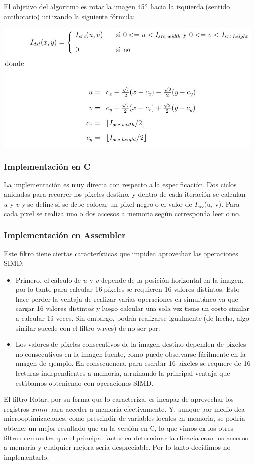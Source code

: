 El objetivo del algoritmo es rotar la imagen 45$\degree$ hacia la izquierda (sentido antihorario) utilizando la siguiente fórmula:

\includegraphics[width=\textwidth]{rotar.jpg} 

\subsubsection{Implementación en C}

La implementación es muy directa con respecto a la especificación. Dos ciclos anidados para recorrer los píxeles destino, y dentro de cada iteración se calculan $u$ y $v$ y se define si se debe colocar un pixel negro o el valor de $I_{src}$(u, v).
Para cada pixel se realiza uno o dos accesos a memoria según corresponda leer o no.

\subsubsection{Implementación en Assembler}

Este filtro tiene ciertas características que impiden aprovechar las operaciones SIMD:
\begin{itemize}
\item Primero, el cálculo de $u$ y $v$ depende de la posición horizontal en la imagen, por lo tanto para calcular 16 píxeles se requieren 16 valores distintos. Esto hace perder la ventaja de realizar varias operaciones en simultáneo ya que cargar 16 valores distintos y luego calcular una sola vez tiene un costo similar a calcular 16 veces. Sin embargo, podría realizarse igualmente (de hecho, algo similar sucede con el filtro waves) de no ser por:
\item Los valores de píxeles consecutivos de la imagen destino dependen de píxeles no consecutivos en la imagen fuente, como puede observarse fácilmente en la imagen de ejemplo. En consecuencia, para escribir 16 píxeles se requiere de 16 lecturas independientes a memoria, arruinando la principal ventaja que estábamos obteniendo con operaciones SIMD.
\end{itemize}

El filtro Rotar, por su forma que lo caracteriza, es incapaz de aprovechar los registros $xmm$ para acceder a memoria efectivamente. Y, aunque por medio dea microoptimizaciones, como prescindir de variables locales en memoria, se podría obtener un mejor resultado que en la versión en C, lo que vimos en los otros filtros demuestra que el principal factor en determinar la eficacia eran los accesos a memoria y cualquier mejora sería despreciable.
Por lo tanto decidimos no implementarlo.